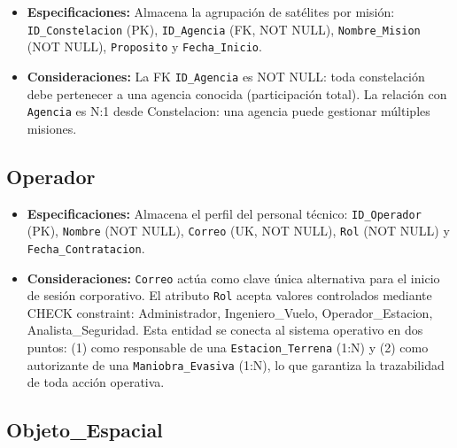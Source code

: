 \begin{itemize}
    \item \textbf{Especificaciones:} Almacena la agrupación de satélites por misión: \texttt{ID\_Constelacion} (PK), \texttt{ID\_Agencia} (FK, NOT NULL), \texttt{Nombre\_Mision} (NOT NULL), \texttt{Proposito} y \texttt{Fecha\_Inicio}.
    \item \textbf{Consideraciones:} La FK \texttt{ID\_Agencia} es NOT NULL: toda constelación debe pertenecer a una agencia conocida (participación total). La relación con \texttt{Agencia} es N:1 desde Constelacion: una agencia puede gestionar múltiples misiones.
\end{itemize}

\subsection{Operador}

\begin{itemize}
    \item \textbf{Especificaciones:} Almacena el perfil del personal técnico: \texttt{ID\_Operador} (PK), \texttt{Nombre} (NOT NULL), \texttt{Correo} (UK, NOT NULL), \texttt{Rol} (NOT NULL) y \texttt{Fecha\_Contratacion}.
    \item \textbf{Consideraciones:} \texttt{Correo} actúa como clave única alternativa para el inicio de sesión corporativo. El atributo \texttt{Rol} acepta valores controlados mediante CHECK constraint: Administrador, Ingeniero\_Vuelo, Operador\_Estacion, Analista\_Seguridad. Esta entidad se conecta al sistema operativo en dos puntos: (1) como responsable de una \texttt{Estacion\_Terrena} (1:N) y (2) como autorizante de una \texttt{Maniobra\_Evasiva} (1:N), lo que garantiza la trazabilidad de toda acción operativa.
\end{itemize}

\subsection{Objeto\_Espacial}

